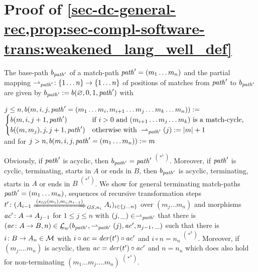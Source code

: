 \section{Proof of \cref{sec-dc-general-rec,prop:sec-compl-software-trans:weakened_lang_well_def}}
\label{sec-proofs:prop:sec-compl-software-trans:weakened_lang_well_def}
The base-path $b_{\mathit{path}'}$ of a match-path $\mathit{path}'=(m_1\ldots m_n)$ and the partial mapping $\rightharpoonup_{\mathit{path}'}\colon \{1\ldots n\} \to \{1\ldots n\}$ of positions of matches from $\mathit{path}'$ to $b_{\mathit{path}'}$ are given by $b_{\mathit{path}'}:=b(\varnothing,0,1,\mathit{path}')$ with
\begin{center}
$j \leq n, b(m,i,j,\mathit{path}'=(m_1\ldots m_i,m_{i+1} \ldots m_j \ldots m_k \ldots m_n)):=$\\
$\begin{cases}
b(m,i,j+1,\mathit{path}') & \text{if $i > 0$ and $(m_{i+1}\ldots m_j \ldots m_k)$ is a match-cycle,}\\
b((m,m_j),j,j+1,\mathit{path}') & \text{otherwise with } \rightharpoonup_{\mathit{path}'}(j):=\left\vert{m}\right\vert + 1
\end{cases}$
\\and for $j > n, b(m,i,j,\mathit{path}'=(m_1\ldots m_n)):=m$  
\end{center}
Obviously, if $\mathit{path}'$ is acyclic, then $b_{\mathit{path}'}=\mathit{path}'$ $^{(*^1)}$.\thispagestyle{plain}
Moreover, if $\mathit{path}'$ is cyclic, terminating, starts in $A$ or ends in $B$, then $b_{\mathit{path}'}$ is acyclic, terminating, starts in $A$ or ends in $B$ $^{(*^2)}$.
We show for general terminating match-paths $\mathit{path}'=(m_1\ldots m_n)$, sequences of recursive transformation steps $t'\colon (A_{i-1} \Trans{(s_\GS(m_i),m_i,n_{i-1})}_{\GS,n_i} A_i)_{i \in \{j\ldots n\}}$ over $(m_j\ldots m_n)$ and morphisms $\mathit{ac}'\colon A \to A_{j-1}$ for $1 \leq j \leq n$ with $(j,\_) \in \rightharpoonup_{\mathit{path}'}$ that there is $(\mathit{ac}\colon A \to B,n) \in \underline{\mathcal{L}}_w(b_{\mathit{path}'},\rightharpoonup_{\mathit{path}'}(j),\mathit{ac}',n_{j-1},\_)$ such that there is $i\colon B \to A_n \in {\cal M}$ with $i \circ \mathit{ac}=\mathit{der}(t') \circ \mathit{ac}'$ and $i \circ n = n_n$ $^{(*^3)}$.
Moreover, if $(m_j\ldots. m_n)$ is acyclic, then $\mathit{ac}=\mathit{der}(t') \circ \mathit{ac}'$ and $n=n_n$ which does also hold for non-terminating $(m_1\ldots m_j\ldots. m_n)$ $^{(*^4)}$.
